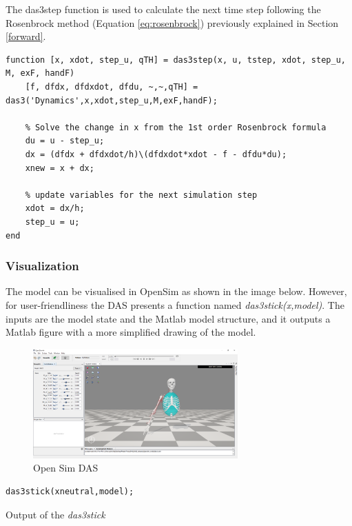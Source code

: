 The das3step function is used to calculate the next time step following the Rosenbrock method (Equation \ref{eq:rosenbrock}) previously explained in Section \ref{forward}.

\begin{lstlisting}[style=Matlab-editor]
function [x, xdot, step_u, qTH] = das3step(x, u, tstep, xdot, step_u, M, exF, handF)
    [f, dfdx, dfdxdot, dfdu, ~,~,qTH] = das3('Dynamics',x,xdot,step_u,M,exF,handF);
    
	% Solve the change in x from the 1st order Rosenbrock formula
	du = u - step_u;
	dx = (dfdx + dfdxdot/h)\(dfdxdot*xdot - f - dfdu*du);
	xnew = x + dx;
	
	% update variables for the next simulation step
	xdot = dx/h;
	step_u = u;
end
\end{lstlisting}\label{matlab:das3step}


\subsubsection{Visualization}

The model can be visualised in OpenSim as shown in the image below. However, for user-friendliness the DAS presents a function named \textit{das3stick(x,model)}. The inputs are the model state and the Matlab model structure, and it outputs a Matlab figure with a more simplified drawing of the model. 
\begin{figure}[h]
    \centering
    \includegraphics[width=0.7\textwidth]{Pictures/DAS/OpenSimModel.png}
    \caption{Open Sim DAS}
    \label{fig:OpenSimDAS}
\end{figure}

\begin{lstlisting}[style=Matlab-editor]
    das3stick(xneutral,model);
 \end{lstlisting}

 Output of the \textit{das3stick}

